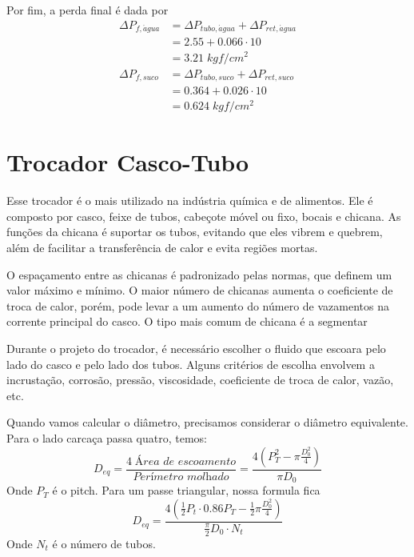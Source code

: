 Por fim, a perda final é dada por
\begin{align}
    \Delta P_{f, \acute{a}gua} &= \Delta P_{tubo, \acute{a}gua} + \Delta P_{ret,\acute{a}gua}\\
    &= 2.55 + 0.066 \cdot 10\\
    &= 3.21 \; kgf/cm^{2}\\
    \Delta P_{f, suco} &= \Delta P_{tubo, suco} + \Delta P_{ret,suco}\\
    &= 0.364 + 0.026 \cdot 10\\
    &= 0.624 \; kgf/cm^{2}
\end{align}
\section{Trocador Casco-Tubo}
Esse trocador é o mais utilizado na indústria química e de alimentos. Ele é composto por casco,
feixe de tubos, cabeçote móvel ou fixo, bocais e chicana. As funções da chicana é suportar os tubos,
evitando que eles vibrem e quebrem, além de facilitar a transferência de calor e evita regiões
mortas. \par

O espaçamento entre as chicanas é padronizado pelas normas, que definem um valor máximo e mínimo. O
maior número de chicanas aumenta o coeficiente de troca de calor, porém, pode levar a um aumento do
número de vazamentos na corrente principal do casco. O tipo mais comum de chicana é a segmentar \par

Durante o projeto do trocador, é necessário escolher o fluido que escoara pelo lado do casco e pelo
lado dos tubos. Alguns critérios de escolha envolvem a incrustação, corrosão, pressão, viscosidade,
coeficiente de troca de calor, vazão, etc. \par

Quando vamos calcular o diâmetro, precisamos considerar o diâmetro equivalente. Para o lado carcaça
passa quatro, temos: 
\begin{equation}\label{eq:diamentro_equivalente_carcaça_4}
    D_{eq} = \frac{4 \; \textit{Área de escoamento}}{\textit{Perímetro molhado}} = \frac{4 \left( P_{T}^{2} - \pi \frac{D_0 ^{2} }{4} \right)}{\pi D_0 } 
\end{equation}
Onde \(P_{T}\) é o pitch. Para um passe triangular, nossa formula fica
\begin{equation}\label{eq:diamentro_equivalente_carcaça_3}
    D_{eq} = \frac{4 \left( \frac{1}{2} P_{t} \cdot 0.86P_{T} - \frac{1}{2} \pi \frac{D_0 ^{2} }{4} \right)}{\frac{\pi}{2}D_0 \cdot N_{t} }
\end{equation}
Onde \(N_{t}\) é o número de tubos. \par

